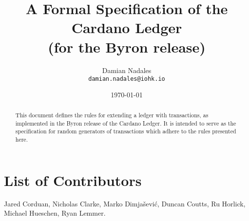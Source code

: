 
\title{
  A Formal Specification of the Cardano Ledger\\
  \small{(for the Byron release)}
}

\author{Damian Nadales \\
  {\small \texttt{damian.nadales@iohk.io}}\\
}

\date{\today}

\maketitle

\begin{abstract}
  This document defines the rules for extending a ledger with transactions, as
  implemented in the Byron release of the Cardano Ledger. It is intended to
  serve as the specification for random generators of transactions which adhere
  to the rules presented here.
\end{abstract}

\section*{List of Contributors}
\label{acknowledgements}

Jared Corduan, Nicholas Clarke, Marko Dimjašević, Duncan Coutts, Ru Horlick,
Michael Hueschen, Ryan Lemmer.
